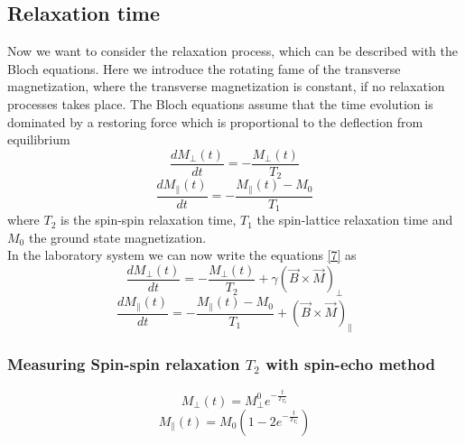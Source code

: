 \subsection{Relaxation time}\label{relax}
Now we want to consider the relaxation process, which can be described with the Bloch equations. Here we introduce the rotating fame of the transverse magnetization, where the transverse magnetization is constant, if no relaxation processes takes place. The Bloch equations assume that the time evolution is dominated by a restoring force which is proportional to the deflection from equilibrium
\begin{equation}
	\label{10}
	\dfrac{dM_{\perp}(t)}{dt} = - \dfrac{M_{\perp}(t)}{T_{2}}
\end{equation}
\begin{equation}
	\label{11}
	\dfrac{dM_{\parallel}(t)}{dt} = - \dfrac{M_{\parallel}(t)-M_{0}}{T_{1}}
\end{equation}
where $T_{2}$ is the spin-spin relaxation time, $T_{1}$ the spin-lattice relaxation time and $M_{0}$ the ground state magnetization.
\vspace{5mm}\\
In the laboratory system we can now write the equations \eqref{7} as
\begin{equation}
	\label{12}
	\dfrac{dM_{\perp}(t)}{dt} = - \dfrac{M_{\perp}(t)}{T_{2}} + \gamma ( \vec{B} \times \vec{M})_{\perp}
\end{equation}
\begin{equation}
	\label{13}
	\dfrac{dM_{\parallel}(t)}{dt} = - \dfrac{M_{\parallel}(t)-M_{0}}{T_{1}} + ( \vec{B} \times 	\vec{M})_{\parallel}
\end{equation}
\subsubsection{Measuring Spin-spin relaxation $T_{2}$ with spin-echo method}
\begin{equation}
	\label{15}
	M_{\perp}(t) = M_{\perp}^{0}e^{-\frac{t}{T_{T_{2}}}}
\end{equation}
\begin{equation}
	\label{16}
	M_{\parallel}(t) = M_{0}(1-2e^{-\frac{t}{T_{T_{1}}}})
\end{equation}